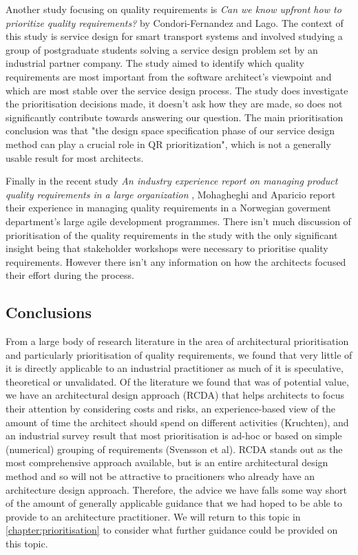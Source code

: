 Another study focusing on quality requirements is \emph{Can we know upfront how to prioritize quality requirements?} \cite{fernandez2015-qrprioritisation} by Condori-Fernandez and Lago.  The context of this study is service design for smart transport systems and involved studying a group of postgraduate students solving a service design problem set by an industrial partner company.  The study aimed to identify which quality requirements are most important from the software architect's viewpoint and which are most stable over the service design process.  The study does investigate the prioritisation decisions made, it doesn't ask how they are made, so does not significantly contribute towards answering our question.  The main prioritisation conclusion was that "the design space specification phase of our service design method can play a crucial role in QR prioritization", which is not a generally usable result for most architects.

Finally in the recent study \emph{An industry experience report on managing product quality requirements in a large organization} \cite{mohagheghi2017-managingqr}, Mohagheghi and Aparicio report their experience in managing quality requirements in a Norwegian goverment department's large agile development programmes.  There isn't much discussion of prioritisation of the quality requirements in the study with the only significant insight being that stakeholder workshops were necessary to prioritise quality requirements.  However there isn't any information on how the architects focused their effort during the process.

\subsection{Conclusions}

From a large body of research literature in the area of architectural prioritisation and particularly prioritisation of quality requirements, we found that very little of it is directly applicable to an industrial practitioner as much of it is speculative, theoretical or unvalidated.  Of the literature we found that was of potential value, we have an architectural design approach (RCDA) that helps architects to focus their attention by considering costs and risks, an experience-based view of the amount of time the architect should spend on different activities (Kruchten), and an industrial survey result that most prioritisation is ad-hoc or based on simple (numerical) grouping of requirements (Svensson et al).  RCDA stands out as the most comprehensive approach available, but is an entire architectural design method and so will not be attractive to pracitioners who already have an architecture design approach.  Therefore, the advice we have falls some way short of the amount of generally applicable guidance that we had hoped to be able to provide to an architecture practitioner.  We will return to this topic in \cref{chapter:prioritisation} to consider what further guidance could be provided on this topic.


